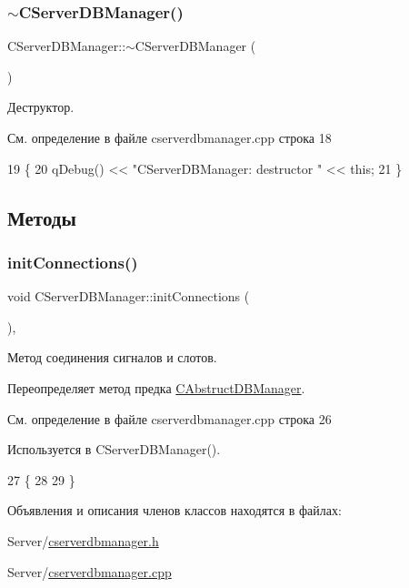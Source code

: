\subsubsection{\texorpdfstring{$\sim$\+C\+Server\+D\+B\+Manager()}{~CServerDBManager()}}
{\footnotesize\ttfamily C\+Server\+D\+B\+Manager\+::$\sim$\+C\+Server\+D\+B\+Manager (\begin{DoxyParamCaption}{ }\end{DoxyParamCaption})}



Деструктор. 



См. определение в файле cserverdbmanager.\+cpp строка 18


\begin{DoxyCode}
19 \{
20     qDebug() << \textcolor{stringliteral}{"CServerDBManager: destructor "} << \textcolor{keyword}{this};
21 \}
\end{DoxyCode}


\subsection{Методы}
\hypertarget{class_c_server_d_b_manager_a6dcd2f88c0845cc79a47bac2ab9e9235}{}\label{class_c_server_d_b_manager_a6dcd2f88c0845cc79a47bac2ab9e9235} 
\subsubsection{\texorpdfstring{init\+Connections()}{initConnections()}}
{\footnotesize\ttfamily void C\+Server\+D\+B\+Manager\+::init\+Connections (\begin{DoxyParamCaption}{ }\end{DoxyParamCaption})\hspace{0.3cm}{\ttfamily [protected]}, {\ttfamily [virtual]}}



Метод соединения сигналов и слотов. 



Переопределяет метод предка \hyperlink{class_c_abstruct_d_b_manager_ad450c557df6d9a7dfcc4a37082f35659}{C\+Abstruct\+D\+B\+Manager}.



См. определение в файле cserverdbmanager.\+cpp строка 26



Используется в C\+Server\+D\+B\+Manager().


\begin{DoxyCode}
27 \{
28 
29 \}
\end{DoxyCode}


Объявления и описания членов классов находятся в файлах\+:\begin{DoxyCompactItemize}
\item 
Server/\hyperlink{cserverdbmanager_8h}{cserverdbmanager.\+h}\item 
Server/\hyperlink{cserverdbmanager_8cpp}{cserverdbmanager.\+cpp}\end{DoxyCompactItemize}
